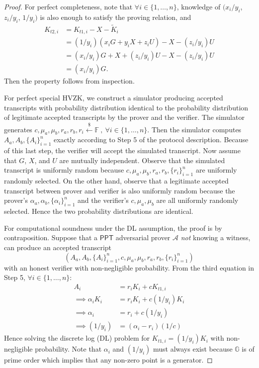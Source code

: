 \documentclass{article}
\theoremstyle{plain}
\theoremstyle{remark}
\begin{document}
\begin{proof}
For perfect completeness, note that $\forall i\in\{1,\ldots,n\}$, knowledge of $(x_i/y_i$, $z_i/y_i$, $1/y_i)$ is also enough to satisfy the proving relation, and
\begin{align*}
K_{t2,i} &= K_{t1,i} - X - \tilde{K}_i \\ &= (1/y_i)(x_i G + y_i X + z_i U) - X - (z_i/y_i)U \\
&= (x_i/y_i)G + X + (z_i/y_i) U - X - (z_i/y_i)U \\ &= (x_i/y_i)G.
\end{align*}
Then the property follows from inspection.

For perfect special HVZK, we construct a simulator producing accepted transcripts with probability distribution identical to the probability distribution of legitimate accepted transcripts by the prover and the verifier. The simulator generates $c, \mu_a, \mu_b, r_a, r_b, r_i \xleftarrow{\$}\mathbb{F}\ ,\ \forall i\in\{1,\ldots,n\}$. Then the simulator computes $A_{a}, A_{b}, \{A_{i}\}_{i=1}^n$ exactly according to Step 5 of the protocol description. Because of this last step, the verifier will accept the simulated transcript. Now assume that $G$, $X$, and $U$ are mutually independent. Observe that the simulated transcript is uniformly random because $c, \mu_a, \mu_b, r_a, r_b, \{r_i\}_{i=1}^n$ are uniformly randomly selected. On the other hand, observe that a legitimate accepted transcript between prover and verifier is also uniformly random because the prover's $\alpha_a, \alpha_b, \{\alpha_i\}_{i=1}^n$ and the verifier's $c, \mu_a, \mu_b$ are all uniformly randomly selected. Hence the two probability distributions are identical.

For computational soundness under the DL assumption, the proof is by contraposition. Suppose that a $\textsf{PPT}$ adversarial prover $\mathcal{A}$ \textit{not} knowing a witness, can produce an accepted transcript $$(A_a, A_b, \{A_i\}_{i=1}^n,c, \mu_a, \mu_b, r_a, r_b, \{r_i\}_{i=1}^n)$$ with an honest verifier with non-negligible probability. From the third equation in Step 5, $\forall i\in\{1,\ldots,n\}$:
\begin{align*}
A_{i} &= r_i K_i + c K_{t1,i} \\
\implies\alpha_i K_i &= r_i K_i + c (1/y_i)K_i \\
\implies\alpha_i &= r_i + c(1/y_i) \\
\implies(1/y_i) &= (\alpha_i - r_i)(1/c)
\end{align*}
Hence solving the discrete log (DL) problem for $K_{t1,i} = (1/y_i)K_i$ with non-negligible probability. Note that $\alpha_i$ and $(1/y_i)$ must always exist because $\mathbb{G}$ is of prime order which implies that any non-zero point is a generator.
\end{proof}
\end{document}
